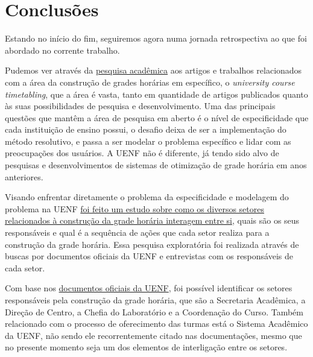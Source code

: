 \chapter{Conclusões} \label{chap:conclusoes} %

Estando no início do fim, seguiremos agora numa jornada retrospectiva ao que foi abordado no corrente trabalho.


Pudemos ver através da \hyperref[chap:marco]{pesquisa acadêmica} aos artigos e trabalhos relacionados com a área da construção de grades horárias em específico, o \textit{university course timetabling}, que a área é vasta, tanto em quantidade de artigos publicados quanto às suas possibilidades de pesquisa e desenvolvimento. Uma das principais questões que mantêm a área de pesquisa em aberto é o nível de especificidade que cada instituição de ensino possui, o desafio deixa de ser a implementação do método resolutivo, e passa a ser modelar o problema específico e lidar com as preocupações dos usuários. A UENF não é diferente, já tendo sido alvo de pesquisas e desenvolvimentos de sistemas de otimização de grade horária em anos anteriores.


Visando enfrentar diretamente o problema da especificidade e modelagem do problema na UENF \hyperref[chap:instituicao]{foi feito um estudo sobre como os diversos setores relacionados à construção da grade horária interagem entre si}, quais são os seus responsáveis e qual é a sequência de ações que cada setor realiza para a construção da grade horária. Essa pesquisa exploratória foi realizada através de buscas por documentos oficiais da UENF e entrevistas com os responsáveis de cada setor.



Com base nos \hyperref[sec:estatuto]{documentos oficiais da UENF}, foi possível identificar os setores responsáveis pela construção da grade horária, que são a Secretaria Acadêmica, a Direção de Centro, a Chefia do Laboratório e a Coordenação do Curso. Também relacionado com o processo de oferecimento das turmas está o Sistema Acadêmico da UENF, não sendo ele recorrentemente citado nas documentações, mesmo que no presente momento seja um dos elementos de interligação entre os setores.

